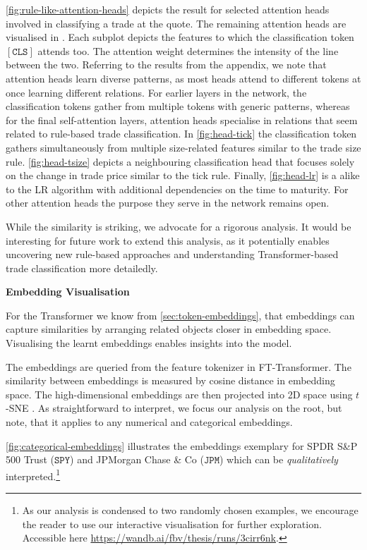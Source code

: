 \cref{fig:rule-like-attention-heads} depicts the result for selected attention heads involved in classifying a trade at the quote. The remaining attention heads are visualised in . Each subplot depicts the features to which the classification token $\mathtt{[CLS]}$ attends too. The attention weight determines the intensity of the line between the two. Referring to the results from the appendix, we note that attention heads learn diverse patterns, as most heads attend to different tokens at once learning different relations. For earlier layers in the network, the classification tokens gather from multiple tokens with generic patterns, whereas for the final self-attention layers, attention heads specialise in relations that seem related to rule-based trade classification. In \cref{fig:head-tick} the classification token gathers simultaneously from multiple size-related features similar to the trade size rule. \cref{fig:head-tsize} depicts a neighbouring classification head that focuses solely on the change in trade price similar to the tick rule. Finally, \cref{fig:head-lr} is a alike to the \gls{LR} algorithm with additional dependencies on the time to maturity. For other attention heads the purpose they serve in the network remains open.

While the similarity is striking, we advocate for a rigorous analysis. It would be interesting for future work to extend this analysis, as it potentially enables uncovering new rule-based approaches and understanding Transformer-based trade classification more detailedly.

\textbf{Embedding Visualisation}

For the Transformer we know from \cref{sec:token-embeddings}, that embeddings can capture similarities by arranging related objects closer in embedding space. Visualising the learnt embeddings enables insights into the model.

The embeddings are queried from the feature tokenizer in FT-Transformer. The similarity between embeddings is measured by cosine distance in embedding space. The high-dimensional embeddings are then projected into 2D space using $t$-SNE \autocite[][2587]{vandermaatenVisualizingDataUsing2008}. As straightforward to interpret, we focus our analysis on the root, but note, that it applies to any numerical and categorical embeddings.

\cref{fig:categorical-embeddings} illustrates the embeddings exemplary for SPDR S\&P 500 Trust ($\mathtt{SPY}$) and JPMorgan Chase \& Co ($\mathtt{JPM}$) which can be \emph{qualitatively} interpreted.\footnote{As our analysis is condensed to two randomly chosen examples, we encourage the reader to use our interactive visualisation for further exploration. Accessible here \url{https://wandb.ai/fbv/thesis/runs/3cirr6nk}.}

